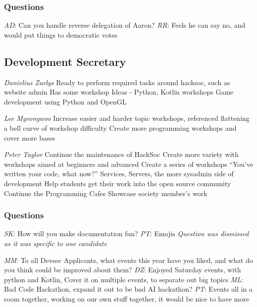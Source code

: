 \documentclass[11pt]{meetingmins}
\begin{document}
\subsubsection{Questions}
\begin{items}
	\item
	\textit{AD}: Can you handle reverse delegation of Aaron?
		\subitem
		\textit{RR}:
			\subsubitem
			Feels he can say no, and would put things to democratic votes
\end{items}


\subsection{Development Secretary}
\begin{items}
	\item
	\textit{Danielius Zurlys}
		\subitem
		Ready to perform required tasks around hacksoc, such as website admin
		\subitem
		Has some workshop Ideas - Python, Kotlin workshops
		\subitem
		Game development using Python and OpenGL
	
	\item
	\textit{Lee Myeongwoo}
		\subitem
		Increase easier and harder topic workshops, referenced flattening a bell curve of workshop difficulty
		\subitem
		Create more programming workshops and cover more bases
	
	\item
	\textit{Peter Taylor}
		\subitem
		Continue the maintenance of HackSoc
		\subitem
		Create more variety with workshops aimed at beginners and advanced
		\subitem
		Create a series of workshops ``You've written your code, what now?''
		\subitem
		Services, Servers, the more sysadmin side of development
		\subitem
		Help students get their work into the open source community
		\subitem
		Continue the Programming Cafes
		\subitem
		Showcase society member's work
\end{items}

\subsubsection{Questions}
\begin{items}
	\item
	\textit{SK}: How will you make documentation fun?
		\subitem
		\textit{PT}:
			\subsubitem
			Emojis
		\subitem
		\textit{Question was dismissed as it was specific to one candidate}

	\item
	\textit{MM}: To all Devsec Applicants, what events this year have you liked, and what do you think could be improved about them?
		\subitem
		\textit{DZ}:
			\subsubitem
			Enjoyed Saturday events, with python and Kotlin, Cover it on multiple events, to separate out big topics
		\subitem
		\textit{ML}:
			\subsubitem
			Bad Code Hackathon, expand it out to be bad AI hackathon?
		\subitem
		\textit{PT}:
			\subsubitem
			Events all in a room together, working on our own stuff together, it would be nice to have more
	
\end{items}
\end{document}
